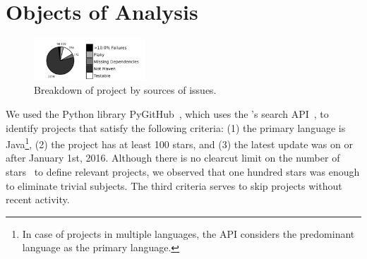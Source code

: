 \documentclass[10pt,journal,compsoc]{IEEEtran}
\begin{document}

\section{Objects of Analysis}
\label{sec:subjects}

\begin{figure}[t]
  \centering
  \includegraphics[width=0.37\textwidth]{results/piechart-subjs.pdf}
  \caption{\label{fig:subjects}Breakdown of project by sources of
    issues.}
\end{figure}

\label{sec:setup}


We used the Python library PyGitHub~, which uses the
\github{}'s search API~\cite{githubsearch}, to identify projects that
satisfy the following criteria: (1) the primary language is
Java\footnote{In case of projects in multiple languages, the \github{}
  API considers the predominant language as the primary language.},
(2) the project has at least 100 stars, and (3) the latest update was
on or after January 1st, 2016. Although there is no clearcut limit on
the number of \github{} stars~\cite{github-stars} to define relevant
projects, we observed that one hundred stars was enough to eliminate
trivial subjects. The third criteria serves to skip projects without
recent activity.
\end{document}
